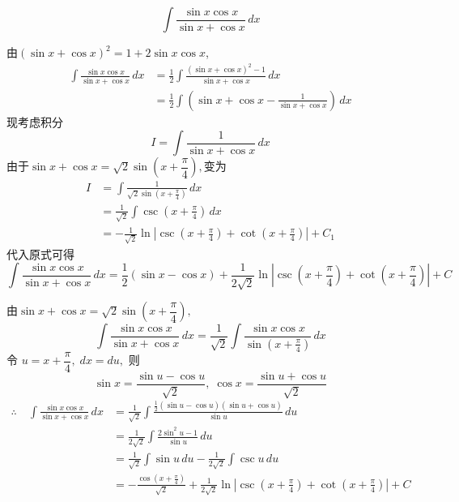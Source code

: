 \begin{questions}
    \question 
    \[
    \int \frac{\sin x \cos x}{\sin x + \cos x}\, dx 
    \]
    \begin{solution}
        由$(\sin x+\cos x)^2=1+2\sin x \cos x$,
        \begin{align*}
        \int \frac{\sin x \cos x}{\sin x + \cos x}\, dx 
        &= \frac{1}{2}\int \frac{(\sin x+\cos x)^{2}-1}{\sin x+\cos x}\,dx \\
        & =\frac{1}{2}\int \left(\sin x+\cos x-\frac{1}{\sin x+\cos x}\right)\,dx
        \end{align*}
        现考虑积分
        \[
        I=\int \frac{1}{\sin x+\cos x}\,dx
        \]
        由于$ \sin x+\cos x=\sqrt{2}\sin \left(x+\dfrac{\pi }{4}\right),$变为
        \begin{align*}
        I&= \int \frac{1}{\sqrt{2}\sin (x+\frac{\pi }{4})}\,dx \\
        &= \frac{1}{\sqrt{2}}\int \csc \left(x+\frac{\pi }{4}\right)\,dx \\
        &= -\frac{1}{\sqrt{2}} \ln \left| \csc \left(x + \frac{\pi}{4}\right) + \cot \left(x + \frac{\pi}{4}\right)\right| + C_1
        \end{align*}
        代入原式可得
        \[
        \int \frac{\sin x \cos x}{\sin x + \cos x} \,dx = \frac{1}{2}(\sin x - \cos x) + \frac{1}{2\sqrt{2}} \ln \left| \csc \left(x + \frac{\pi}{4}\right) + \cot \left(x + \frac{\pi}{4}\right) \right| + C
        \]
    \end{solution}
    \begin{solution}
        由$\sin x+\cos x=\sqrt2 \sin\left(x+\dfrac{\pi}{4}\right),$
        \[
        \int \frac{\sin x \cos x}{\sin x + \cos x} \, dx 
        = \frac{1}{\sqrt{2}} \int \frac{\sin x \cos x}{\sin\left(x + \frac{\pi}{4}\right)} \, dx         
        \]
        令 $u = x + \dfrac{\pi}{4},\; dx = du,$ 则
        \[
        \sin x = \frac{\sin u - \cos u}{\sqrt{2}}, \;
        \cos x = \frac{\sin u + \cos u}{\sqrt{2}}
        \]
        \begin{align*}
        \therefore\quad 
        \int \frac{\sin x \cos x}{\sin x + \cos x} \, dx 
        &= \frac{1}{\sqrt{2}} \int \frac{\frac{1}{2}(\sin u - \cos u)(\sin u + \cos u)}{\sin u} \, du \\
        &= \frac{1}{2\sqrt{2}} \int \frac{2\sin^2 u - 1}{\sin u} \, du \\ 
        &= \frac{1}{\sqrt{2}} \int \sin u \, du- \frac{1}{2\sqrt{2}} \int \csc u \, du \\ 
        &=-\frac{\cos(x+\frac{\pi}{4})}{\sqrt{2}}
        +\frac{1}{2\sqrt{2}} \ln \left| \csc \left(x + \frac{\pi}{4}\right) + \cot \left(x + \frac{\pi}{4}\right) \right|+C 
        \end{align*}
    \end{solution}


\end{questions}

